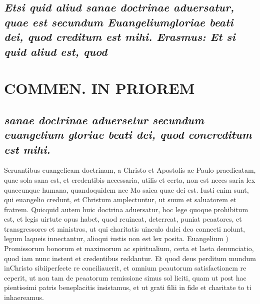 \documentclass{article}
\begin{document}
\begin{pages}
\subsection*{\textit{Etsi quid aliud sanae doctrinae aduersatur, quae est secundum Euangeliumgloriae beati dei, quod creditum est mihi. Erasmus: Et si quid aliud est, quod }}
\section*{COMMEN. IN PRIOREM }
\marginpar{[ p.22 ]}
{}
\subsection*{\textit{sanae doctrinae aduersetur secundum euangelium gloriae beati dei, quod concreditum est mihi. }}\pstart Seruantibus euangelicam doctrinam, a Christo et Apostolis ac Paulo praedicatam, quae sola sana est, et credentibis necessaria, utilis et certa, non est neces saria lex quaecunque humana, quandoquidem nec Mo saica quae dei est. Iusti enim sunt, qui euangelio credunt, et Christum amplectuntur, ut suum et saluatorem et fratrem. Quicquid autem huic doctrina aduersatur, hoc lege quoque prohibitum est, et legis uirtute opus habet, quod reuincat, deterreat, puniat peaatores, et transgressores et ministros, ut qui charitatis uinculo dulci deo connecti nolunt, legum laqueis innectantur, alioqui iustis non est lex posita.  \pend\pstart Euangelium ) Promissorum bonorum et maximorum ac spiritualium, certa et laeta denunciatio, quod iam nunc instent et credentibus reddantur. Et quod deus perditum mundum inChristo sibiiperfecte re conciliauerit, et omnium peautorum satisfactionem re ceperit, ut non tam de peaatorum remissione simus sol liciti, quam ut post hac pientissimi patris beneplacitis insistamus, et ut grati filii in fide et charitate to ti inhaereamus.  \pend

\end{pages}
\end{document}
